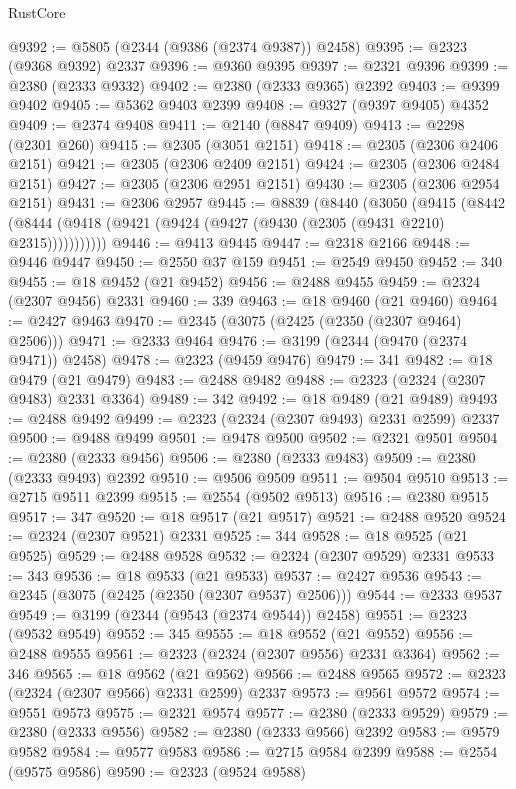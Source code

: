 \begin{lexlean}{RustCore}
\begin{coremodule}
@9392 := @5805 (@2344 (@9386 (@2374 @9387)) @2458)
@9395 := @2323 (@9368 @9392) @2337
@9396 := @9360 @9395
@9397 := @2321 @9396
@9399 := @2380 (@2333 @9332)
@9402 := @2380 (@2333 @9365) @2392
@9403 := @9399 @9402
@9405 := @5362 @9403 @2399
@9408 := @9327 (@9397 @9405) @4352
@9409 := @2374 @9408
@9411 := @2140 (@8847 @9409)
@9413 := @2298 (@2301 @260)
@9415 := @2305 (@3051 @2151)
@9418 := @2305 (@2306 @2406 @2151)
@9421 := @2305 (@2306 @2409 @2151)
@9424 := @2305 (@2306 @2484 @2151)
@9427 := @2305 (@2306 @2951 @2151)
@9430 := @2305 (@2306 @2954 @2151)
@9431 := @2306 @2957
@9445 := @8839
    (@8440
      (@3050
        (@9415
          (@8442 (@8444 (@9418 (@9421 (@9424 (@9427 (@9430 (@2305 (@9431 @2210) @2315)))))))))))
@9446 := @9413 @9445
@9447 := @2318 @2166
@9448 := @9446 @9447
@9450 := @2550 @37 @159
@9451 := @2549 @9450
@9452 := 340
@9455 := @18 @9452 (@21 @9452)
@9456 := @2488 @9455
@9459 := @2324 (@2307 @9456) @2331
@9460 := 339
@9463 := @18 @9460 (@21 @9460)
@9464 := @2427 @9463
@9470 := @2345 (@3075 (@2425 (@2350 (@2307 @9464) @2506)))
@9471 := @2333 @9464
@9476 := @3199 (@2344 (@9470 (@2374 @9471)) @2458)
@9478 := @2323 (@9459 @9476)
@9479 := 341
@9482 := @18 @9479 (@21 @9479)
@9483 := @2488 @9482
@9488 := @2323 (@2324 (@2307 @9483) @2331 @3364)
@9489 := 342
@9492 := @18 @9489 (@21 @9489)
@9493 := @2488 @9492
@9499 := @2323 (@2324 (@2307 @9493) @2331 @2599) @2337
@9500 := @9488 @9499
@9501 := @9478 @9500
@9502 := @2321 @9501
@9504 := @2380 (@2333 @9456)
@9506 := @2380 (@2333 @9483)
@9509 := @2380 (@2333 @9493) @2392
@9510 := @9506 @9509
@9511 := @9504 @9510
@9513 := @2715 @9511 @2399
@9515 := @2554 (@9502 @9513)
@9516 := @2380 @9515
@9517 := 347
@9520 := @18 @9517 (@21 @9517)
@9521 := @2488 @9520
@9524 := @2324 (@2307 @9521) @2331
@9525 := 344
@9528 := @18 @9525 (@21 @9525)
@9529 := @2488 @9528
@9532 := @2324 (@2307 @9529) @2331
@9533 := 343
@9536 := @18 @9533 (@21 @9533)
@9537 := @2427 @9536
@9543 := @2345 (@3075 (@2425 (@2350 (@2307 @9537) @2506)))
@9544 := @2333 @9537
@9549 := @3199 (@2344 (@9543 (@2374 @9544)) @2458)
@9551 := @2323 (@9532 @9549)
@9552 := 345
@9555 := @18 @9552 (@21 @9552)
@9556 := @2488 @9555
@9561 := @2323 (@2324 (@2307 @9556) @2331 @3364)
@9562 := 346
@9565 := @18 @9562 (@21 @9562)
@9566 := @2488 @9565
@9572 := @2323 (@2324 (@2307 @9566) @2331 @2599) @2337
@9573 := @9561 @9572
@9574 := @9551 @9573
@9575 := @2321 @9574
@9577 := @2380 (@2333 @9529)
@9579 := @2380 (@2333 @9556)
@9582 := @2380 (@2333 @9566) @2392
@9583 := @9579 @9582
@9584 := @9577 @9583
@9586 := @2715 @9584 @2399
@9588 := @2554 (@9575 @9586)
@9590 := @2323 (@9524 @9588)

\end{coremodule}
\end{lexlean}

